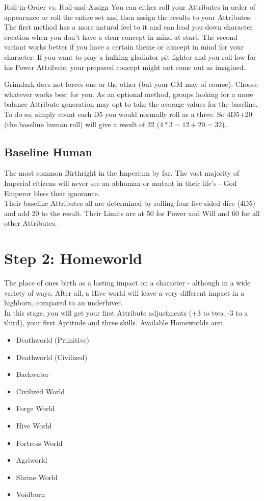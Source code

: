 	\begin{DndSidebar}{Roll-in-Order vs. Roll-and-Assign}
	You can either roll your Attributes in order of appearance or roll the entire set and then assign the results to your Attributes.
	The first method has a more natural feel to it and can lead you down character creation when you don't have a clear concept in mind at start. The second variant works better if you have a certain theme or concept in mind for your character. If you want to play a hulking gladiator pit fighter and you roll low for his Power Attribute, your prepared concept might not come out as imagined.

	Grimdark does not forces one or the other (but your GM may of course). Choose whatever works best for you.
	As an optional method, groups looking for a more balance Attribute generation may opt to take the average values for the baseline. To do so, simply count each D5 you would normally roll as a three. So 4D5+20 (the baseline human roll) will give a result of 32 ($4*3=12 + 20 = 32$).
	\end{DndSidebar}

	\subsection{Baseline Human}
	The most common Birthright in the Imperium by far. The vast majority of Imperial citizens will never see an abhuman or mutant in their life's - God Emperor bless their ignorance.\\
	Their baseline Attributes all are determined by rolling four five sided dice (4D5) and add 20 to the result.
	Their Limits are at 50 for Power and Will and 60 for all other Attributes.

\section{Step 2: Homeworld} %
	\label{sec:lifepath_2_Homeworld}
	The place of ones birth as a lasting impact on a character - although in a wide variety of ways. After all, a Hive world will leave a very different impact in a highborn, compared to an underhiver.\\
	In this stage, you will get your first Attribute adjustments (+3 to two, -3 to a third), your first Aptitude and three skills.
	Available Homeworlds are:
	\begin{itemize}
		\item Deathworld (Primitive)
		\item Deathworld (Civilized)
		\item Backwater
		\item Civilized World
		\item Forge World
		\item Hive World
		\item Fortress World
		\item Agriworld
		\item Shrine World
		\item Voidborn
	\end{itemize}



